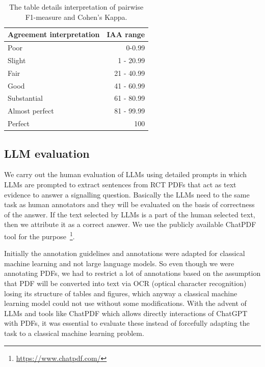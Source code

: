 \documentclass[sn-mathphys,Numbered]{sn-jnl}%
\theoremstyle{thmstyleone}%
\theoremstyle{thmstyletwo}%
\theoremstyle{thmstylethree}%
\begin{document}
%
%
%
\begin{center}
 \begin{table}[ht]
   \caption{The table details interpretation of pairwise F1-measure and Cohen's Kappa.}\label{tab:iaa_interpret}
 \centering
    \begin{tabular}{|l|r|}
    \hline
    Agreement interpretation & IAA range \\ 
    \hline
    \hline
        Poor & 0-0.99 \\ 
        Slight & 1 - 20.99 \\ 
        Fair & 21 - 40.99 \\ 
        Good & 41 - 60.99 \\ 
        Substantial & 61 - 80.99 \\ 
        Almost perfect & 81 - 99.99 \\ 
        Perfect & 100 \\ 
    \hline
    \end{tabular}
 \end{table}   
\end{center}
%
%
%
%
%
%
\subsection{LLM evaluation}
\label{llms}
%
We carry out the human evaluation of LLMs using detailed prompts in which LLMs are prompted to extract sentences from RCT PDFs that act as text evidence to answer a signalling question.
Basically the LLMs need to the same task as human annotators and they will be evaluated on the basis of correctness of the answer.
If the text selected by LLMs is a part of the human selected text, then we attribute it as a correct answer.
We use the publicly available ChatPDF tool for the purpose~\footnote{\url{https://www.chatpdf.com/}}.


Initially the annotation guidelines and annotations were adapted for classical machine learning and not large language models.
So even though we were annotating PDFs, we had to restrict a lot of annotations based on the assumption that PDF will be converted into text via OCR (optical character recognition) losing its structure of tables and figures, which anyway a classical machine learning model could not use without some modifications.
With the advent of LLMs and tools like ChatPDF which allows directly interactions of ChatGPT with PDFs, it was essential to evaluate these instead of forcefully adapting the task to a classical machine learning problem.
%
%
%
\end{document}
